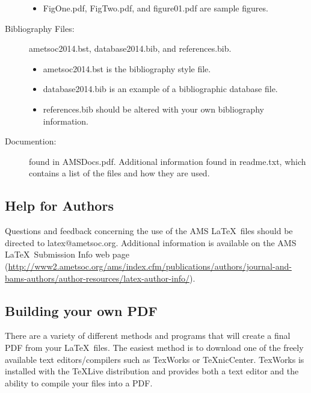 \documentclass{ametsoc}
\begin{document}
\begin{description}
\begin{itemize}
\item
FigOne.pdf, FigTwo.pdf, and figure01.pdf are sample figures.


\end{itemize}

\item[Bibliography Files:]

ametsoc2014.bst, database2014.bib, and references.bib.  

\begin{itemize}
\item
ametsoc2014.bst is the bibliography style file. 

\item
database2014.bib is an example of a bibliographic database file.

\item
references.bib should be altered with your own bibliography information.  
\end{itemize}



\item[Documention:] found in AMSDocs.pdf. Additional information
found in
readme.txt, which contains a list of the files and how they are used.

\end{description}

\subsection{Help for Authors}
Questions and feedback concerning the use of the AMS \LaTeX\ files should be
directed to latex@ametsoc.org. Additional information is available on the AMS
\LaTeX\ Submission Info web page (\url{http://www2.ametsoc.org/ams/index.cfm/publications/authors/journal-and-bams-authors/author-resources/latex-author-info/}).



\appendix[C]

\subsection{Building your own PDF}
There are a variety of different methods and programs that will create a
final PDF from your \LaTeX\ files. The easiest method is to download one of
the freely available text editors/compilers such as TexWorks or TeXnicCenter.
TexWorks is installed with the TeXLive distribution and provides both a text
editor and the ability to compile your files into a PDF.
\end{document}

